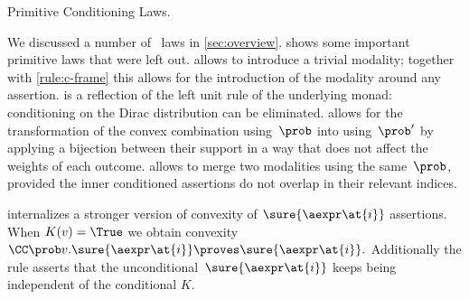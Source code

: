 \begin{mathfig}[\small]
  \begin{proofrules}
         \label{rule:c-true}

         \label{rule:c-unit-l}

         \label{rule:c-transf}

         \label{rule:c-and}

         \label{rule:sure-str-convex}

         \label{rule:c-pure}
  \end{proofrules}
  \caption{Primitive Conditioning Laws.}
  \label{fig:cond-laws}
\end{mathfig}

We discussed a number of \supercond\ laws in \cref{sec:overview}.
 shows some important primitive laws
that were left out.
 allows to introduce a trivial modality;
together with \ref{rule:c-frame} this allows for the introduction
of the modality around any assertion.
 is a reflection of the left unit rule of the underlying
monad: conditioning on the Dirac distribution can be eliminated.
 allows for the transformation of the
convex combination using~$\prob$
into using~$\prob'$ by applying a bijection between their support
in a way that does not affect the weights of each outcome.
 allows to merge two modalities using the same~$\prob$,
provided the inner conditioned assertions do not overlap
in their relevant indices.


 internalizes a stronger version of convexity of
$ \sure{\aexpr\at{i}} $ assertions.
When $K(v) = \True$ we obtain convexity
$
  \CC\prob v.\sure{\aexpr\at{i}}
  \proves
  \sure{\aexpr\at{i}}.
$
Additionally the rule asserts that the unconditional~$\sure{\aexpr\at{i}}$
keeps being independent of the conditional $K$.

